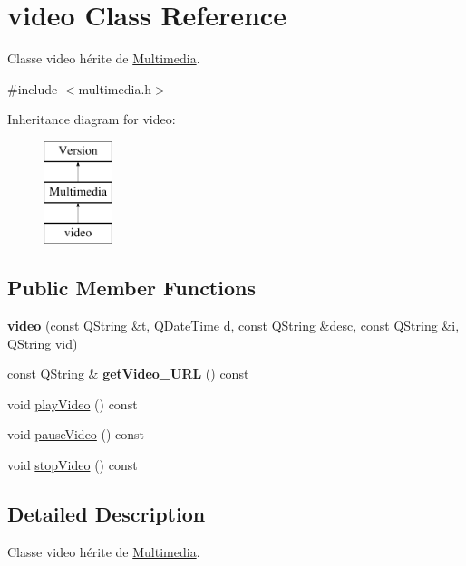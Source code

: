 \hypertarget{classvideo}{}\section{video Class Reference}
\label{classvideo}


Classe video hérite de \hyperlink{class_multimedia}{Multimedia}.  




{\ttfamily \#include $<$multimedia.\+h$>$}

Inheritance diagram for video\+:\begin{figure}[H]
\begin{center}
\leavevmode
\includegraphics[height=3.000000cm]{classvideo}
\end{center}
\end{figure}
\subsection*{Public Member Functions}
\begin{DoxyCompactItemize}
\item 
\mbox{\label{classvideo_a2a591da294b0c93de60d1241b1452d50}} 
{\bfseries video} (const Q\+String \&t, Q\+Date\+Time d, const Q\+String \&desc, const Q\+String \&i, Q\+String vid)
\item 
\mbox{\label{classvideo_a1b68b660607eb3a0a0293e44ffdcf467}} 
const Q\+String \& {\bfseries get\+Video\+\_\+\+U\+RL} () const
\item 
void \hyperlink{classvideo_a557dedaa9915167c5a4ad1eacc9c8a27}{play\+Video} () const
\item 
void \hyperlink{classvideo_a0764c1d92417fdf53a29121ba7caa395}{pause\+Video} () const
\item 
void \hyperlink{classvideo_ac1ead8f204bd32ca5bff3eb0748e5ca7}{stop\+Video} () const
\end{DoxyCompactItemize}


\subsection{Detailed Description}
Classe video hérite de \hyperlink{class_multimedia}{Multimedia}. 

